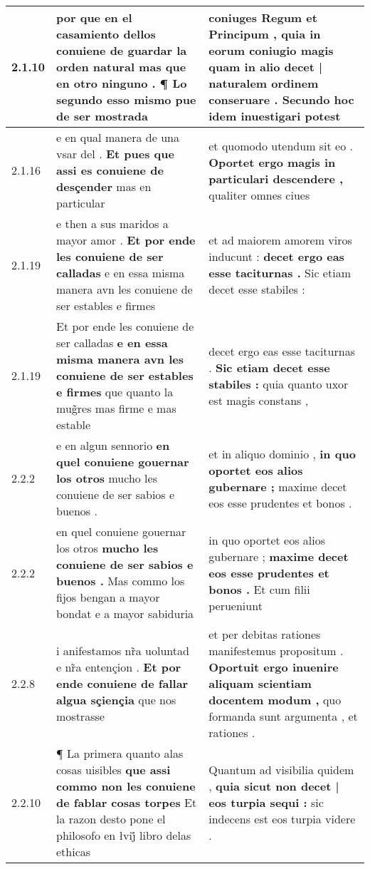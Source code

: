 \begin{tabular}{|p{1cm}|p{6.5cm}|p{6.5cm}|}
2.1.10 & por que en el casamiento \textbf{ dellos conuiene de guardar la orden natural mas que en otro ninguno . } ¶ Lo segundo esso mismo pue de ser mostrada & coniuges Regum et Principum , \textbf{ quia in eorum coniugio magis quam in alio decet | naturalem ordinem conseruare . } Secundo hoc idem inuestigari potest \\\hline
2.1.16 & e en qual manera de una vsar del . \textbf{ Et pues que assi es conuiene de desçender } mas en particular & et quomodo utendum sit eo . \textbf{ Oportet ergo magis in particulari descendere , } qualiter omnes ciues \\\hline
2.1.19 & e then a sus maridos a mayor amor . \textbf{ Et por ende les conuiene de ser calladas } e en essa misma manera avn les conuiene de ser estables e firmes & et ad maiorem amorem viros inducunt : \textbf{ decet ergo eas esse taciturnas . } Sic etiam decet esse stabiles : \\\hline
2.1.19 & Et por ende les conuiene de ser calladas \textbf{ e en essa misma manera avn les conuiene de ser estables e firmes } que quanto la mug̃res mas firme e mas estable & decet ergo eas esse taciturnas . \textbf{ Sic etiam decet esse stabiles : } quia quanto uxor est magis constans , \\\hline
2.2.2 & e en algun sennorio \textbf{ en quel conuiene gouernar los otros } mucho les conuiene de ser sabios e buenos . & et in aliquo dominio , \textbf{ in quo oportet eos alios gubernare ; } maxime decet eos esse prudentes et bonos . \\\hline
2.2.2 & en quel conuiene gouernar los otros \textbf{ mucho les conuiene de ser sabios e buenos . } Mas commo los fijos bengan a mayor bondat e a mayor sabiduria & in quo oportet eos alios gubernare ; \textbf{ maxime decet eos esse prudentes et bonos . } Et cum filii perueniunt \\\hline
2.2.8 & i anifestamos nr̃a uoluntad e nr̃a entençion . \textbf{ Et por ende conuiene de fallar algua sçiençia } que nos mostrasse & et per debitas rationes manifestemus propositum . \textbf{ Oportuit ergo inuenire aliquam scientiam docentem modum , } quo formanda sunt argumenta , et rationes . \\\hline
2.2.10 & ¶ La primera quanto alas cosas uisibles \textbf{ que assi commo non les conuiene de fablar cosas torpes } Et la razon desto pone el philosofo en łvij̊ libro delas ethicas & Quantum ad visibilia quidem , \textbf{ quia sicut non decet | eos turpia sequi : } sic indecens est eos turpia videre . \\\hline

\end{tabular}
